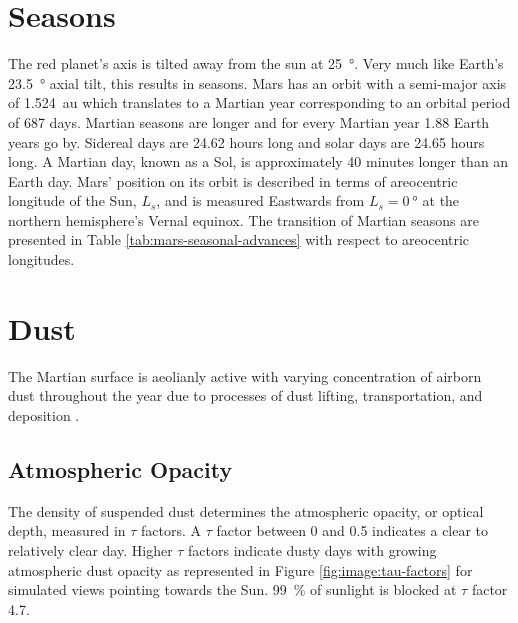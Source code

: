 %

\section{Seasons}
\label{sec:MartianEnvironment:Seasons}
The red planet's axis is tilted away from the sun at \SI{25}{\degree}. Very much like Earth's \SI{23.5}{\degree} axial tilt, this results in seasons. Mars has an orbit with a semi-major axis of \SI{1.524}{\astronomicalunit} which translates to a Martian year corresponding to an orbital period of 687 days. Martian seasons are longer and for every Martian year 1.88 Earth years go by. Sidereal days are 24.62 hours long and solar days are 24.65 hours long. A Martian day, known as a Sol, is approximately 40 minutes longer than an Earth day. Mars' position on its orbit is described in terms of areocentric longitude of the Sun, $L_{s}$, and is measured Eastwards from $L_{s} = \SI{0}{\degree}$ at the northern hemisphere's Vernal equinox. The transition of Martian seasons are presented in Table \ref{tab:mars-seasonal-advances} with respect to areocentric longitudes.




\section{Dust}
\label{sec:MartianEnvironment:Dust}
The Martian surface is aeolianly active with varying concentration of airborn dust throughout the year due to processes of dust lifting, transportation, and deposition .


\subsection{Atmospheric Opacity}
\label{sec:MartianEnvironment:Dust:AtmosphericOpacity}
The density of suspended dust determines the atmospheric opacity, or optical depth, measured in $\tau$ factors. A $\tau$ factor between 0 and 0.5 indicates a clear to relatively clear day. Higher $\tau$ factors indicate dusty days with growing atmospheric dust opacity as represented in Figure \ref{fig:image:tau-factors} for simulated views pointing towards the Sun. \SI{99}{\percent} of sunlight is blocked at $\tau$ factor 4.7.


